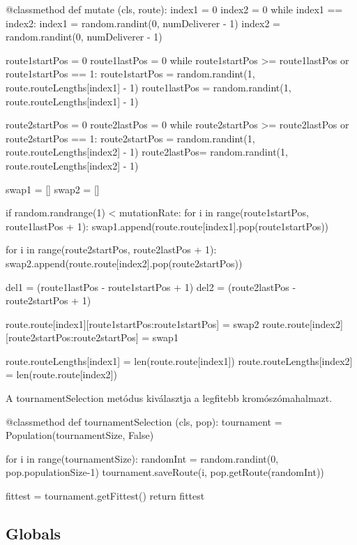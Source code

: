 \begin{python}
@classmethod
def mutate (cls, route):
    index1 = 0
    index2 = 0
    while index1 == index2:
        index1 = random.randint(0, numDeliverer - 1)
        index2 = random.randint(0, numDeliverer - 1)

    route1startPos = 0
    route1lastPos = 0
    while route1startPos >= route1lastPos or route1startPos == 1:
        route1startPos = random.randint(1, route.routeLengths[index1] - 1)
        route1lastPos = random.randint(1, route.routeLengths[index1] - 1)

    route2startPos = 0
    route2lastPos = 0
    while route2startPos >= route2lastPos or route2startPos == 1:
        route2startPos = random.randint(1, route.routeLengths[index2] - 1)
        route2lastPos= random.randint(1, route.routeLengths[index2] - 1)

    swap1 = []
    swap2 = [] 

    if random.randrange(1) < mutationRate:
        for i in range(route1startPos, route1lastPos + 1):
            swap1.append(route.route[index1].pop(route1startPos))

        for i in range(route2startPos, route2lastPos + 1):
            swap2.append(route.route[index2].pop(route2startPos))

        del1 = (route1lastPos - route1startPos + 1)
        del2 = (route2lastPos - route2startPos + 1)

        route.route[index1][route1startPos:route1startPos] = swap2
        route.route[index2][route2startPos:route2startPos] = swap1

        route.routeLengths[index1] = len(route.route[index1])
        route.routeLengths[index2] = len(route.route[index2])
\end{python}

A tournamentSelection metódus kiválasztja a legfitebb kromószómahalmazt.

\begin{python}
@classmethod
def tournamentSelection (cls, pop):
    tournament = Population(tournamentSize, False)

    for i in range(tournamentSize):
        randomInt = random.randint(0, pop.populationSize-1)
        tournament.saveRoute(i, pop.getRoute(randomInt))

    fittest = tournament.getFittest()
    return fittest
\end{python}

\subsection{
Globals
}


